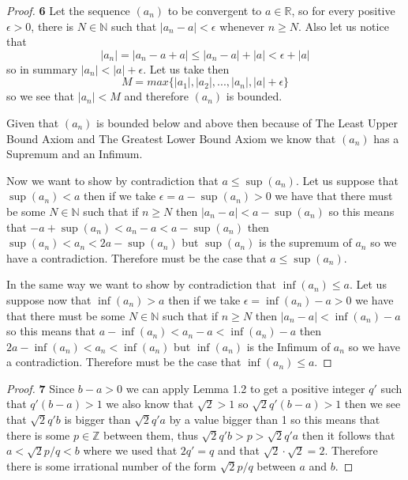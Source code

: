 \documentclass[11pt]{article}
\newcommand{\N}{\mathbb{N}}
\newcommand{\Z}{\mathbb{Z}}
\newcommand{\R}{\mathbb{R}}
\theoremstyle{definition}
\begin{document}
\cleardoublepage
    \begin{proof}{\textbf{6}}
        Let the sequence $(a_n)$ to be  convergent to $a \in \R$, so for every positive
        $\epsilon >0$, there is $N \in \N$ such that $|a_n - a| < \epsilon$ whenever
        $n \geq N$. Also let us notice that
        $$|a_n| = |a_n - a + a| \leq |a_n - a| + |a| < \epsilon + |a|$$
        so in summary $|a_n| < |a| + \epsilon$. Let us take then
        $$M = max\{|a_1|, |a_2|, ..., |a_n|, |a| + \epsilon\}$$
        so we see that $|a_n| < M$ and therefore $(a_n)$ is bounded.

        Given that $(a_n)$ is bounded below and above then because of The Least Upper
        Bound Axiom and The Greatest Lower Bound Axiom we know that $(a_n)$ has a
        Supremum and an Infimum.

        Now we want to show by contradiction that $a\leq \sup(a_n)$.
        Let us suppose that $\sup(a_n) < a$ then if we take $\epsilon = a - \sup(a_n) > 0$
        we have that there must be some $N \in \N$ such that if $n \geq N$ then 
        $|a_n - a| < a - \sup(a_n)$ so this means that
        $-a + \sup(a_n) < a_n - a < a - \sup(a_n)$ then 
        $\sup(a_n)< a_n < 2a - \sup(a_n)$ but $\sup(a_n)$ is the supremum of $a_n$ so
        we have a contradiction. Therefore must be the case that $a\leq \sup(a_n)$.

        In the same way we want to show by contradiction that $\inf(a_n) \leq a$.
        Let us suppose now that $\inf(a_n) > a$ then if we take
        $\epsilon = \inf(a_n) - a > 0$
        we have that there must be some $N \in \N$ such that if $n \geq N$ then 
        $|a_n - a| < \inf(a_n) - a$ so this means that
        $a-\inf(a_n) < a_n - a < \inf(a_n) - a$ then 
        $2a - \inf(a_n)< a_n < \inf(a_n)$ but $\inf(a_n)$ is the Infimum of $a_n$ so
        we have a contradiction. Therefore must be the case that $\inf(a_n) \leq a$.
    \end{proof}
    \begin{proof}{\textbf{7}}
        Since $b-a>0$ we can apply Lemma 1.2 to get a positive integer $q'$ such that
        $q'(b-a)>1$ we also know that $\sqrt{2}>1$ so $\sqrt{2}q'(b-a)>1$ then we see that
        $\sqrt{2}q'b$ is bigger than $\sqrt{2}q'a$ by a value bigger than 1 so this means
        that there is some $p \in \Z$ between them, thus $\sqrt{2}q'b > p > \sqrt{2}q'a$
        then it follows that $a < \sqrt{2}p/q < b$ where we used that $2q' = q$
        and that $\sqrt{2}\cdot\sqrt{2} = 2$. Therefore there is some irrational number
        of the form $\sqrt{2}p/q$ between $a$ and $b$.
    \end{proof}
\end{document}
